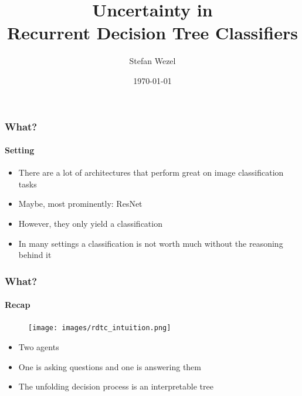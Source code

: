 \documentclass[9pt]{beamer}
\title{Uncertainty in\\Recurrent Decision Tree Classifiers}
\author{Stefan Wezel}
\institute{Explainable Machine Learning}
\date{\today}
\begin{document}
	
\begin{frame}[plain]
	\titlepage
\end{frame} 

\begin{frame}
\frametitle{What?}
\framesubtitle{Setting}
	\begin{itemize}\setlength\itemsep{1em}
	\item There are a lot of architectures that perform great on image classification tasks
	\item Maybe, most prominently: ResNet
	\item However, they only yield a classification
	\item In many settings a classification is not worth much without the reasoning behind it
	\end{itemize}
\end{frame} 



\begin{frame}
\frametitle{What?}
\framesubtitle{Recap}
	\begin{figure}
	\centering
	\texttt{[image: images/rdtc\_intuition.png]}
\end{figure}
\begin{itemize}\setlength\itemsep{1em}
	\item Two agents
	\item One is asking questions and one is answering them
	\item The unfolding decision process is an interpretable tree
\end{itemize}
\end{frame} 
\end{document}

